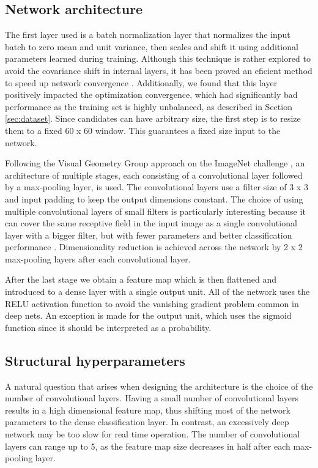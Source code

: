    \subsection{Network architecture}
        The first layer used is a batch normalization layer \cite{DBLP:journals/corr/IoffeS15} that normalizes the input batch to zero mean and unit variance, then scales and shift it using additional parameters learned during training. Although this technique is rather explored to avoid the covariance shift in internal layers, it has been proved an eficient method to speed up network convergence \cite{DBLP:journals/corr/IoffeS15}. Additionally, we found that this layer positively impacted the optimization convergence, which had significantly bad performance as the training set is highly unbalanced, as described in Section \ref{sec:dataset}. Since candidates can have arbitrary size, the first step is to resize them to a fixed 60 x 60 window. This guarantees a fixed size input to the network.

        Following the Visual Geometry Group approach on the ImageNet challenge \cite{Simonyan14c}, an architecture of multiple stages, each consisting of a convolutional layer followed by a max-pooling layer, is used. The convolutional layers use  a filter size of 3 x 3 and input padding to keep the output dimensions constant. The choice of using multiple convolutional layers of small filters is particularly interesting because it can cover the same receptive field in the input image as a single convolutional layer with a bigger filter, but with fewer parameters and better classification performance \cite{Simonyan14c}. Dimensionality reduction is achieved across the network by 2 x 2 max-pooling layers after each convolutional layer.

        After the last stage we obtain a feature map which is then flattened and introduced to a dense layer with a single output unit. All of the network uses the RELU \cite{nair2010relu} activation function to avoid the vanishing gradient problem common in deep nets. An exception is made for the output unit, which uses the sigmoid function since it should be interpreted as a probability.

    \subsection{Structural hyperparameters}
        A natural question that arises when designing the architecture is the choice of the number of convolutional layers. Having a small number of convolutional layers results in a high dimensional feature map, thus shifting most of the network parameters to the dense classification layer. In contrast, an excessively deep network may be too slow for real time operation. The number of convolutional layers can range up to 5, as the feature map size decreases in half after each max-pooling layer.

